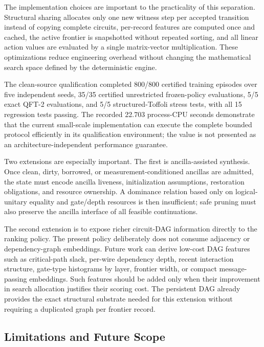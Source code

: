 \documentclass[
]{article}
\begin{document}
The implementation choices are important to the practicality of this
separation. Structural sharing allocates only one new witness step per
accepted transition instead of copying complete circuits, per-record
features are computed once and cached, the active frontier is
snapshotted without repeated sorting, and all linear action values are
evaluated by a single matrix-vector multiplication. These optimizations
reduce engineering overhead without changing the mathematical search
space defined by the deterministic engine.

The clean-source qualification completed 800/800 certified training
episodes over five independent seeds, 35/35 certified unrestricted
frozen-policy evaluations, 5/5 exact QFT-2 evaluations, and 5/5
structured-Toffoli stress tests, with all 15 regression tests passing.
The recorded 22.703 process-CPU seconds demonstrate that the current
small-scale implementation can execute the complete bounded protocol
efficiently in its qualification environment; the value is not presented
as an architecture-independent performance guarantee.

Two extensions are especially important. The first is ancilla-assisted
synthesis. Once clean, dirty, borrowed, or measurement-conditioned
ancillas are admitted, the state must encode ancilla liveness,
initialization assumptions, restoration obligations, and resource
ownership. A dominance relation based only on logical-unitary equality
and gate/depth resources is then insufficient; safe pruning must also
preserve the ancilla interface of all feasible continuations.

The second extension is to expose richer circuit-DAG information
directly to the ranking policy. The present policy deliberately does not
consume adjacency or dependency-graph embeddings. Future work can derive
low-cost DAG features such as critical-path slack, per-wire dependency
depth, recent interaction structure, gate-type histograms by layer,
frontier width, or compact message-passing embeddings. Such features
should be added only when their improvement in search allocation
justifies their scoring cost. The persistent DAG already provides the
exact structural substrate needed for this extension without requiring a
duplicated graph per frontier record.

\hypertarget{limitations-and-future-scope}{%
\subsection{Limitations and Future
Scope}\label{limitations-and-future-scope}}
\end{document}
